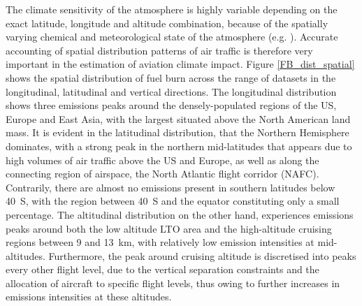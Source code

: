 The climate sensitivity of the atmosphere is highly variable depending on the exact latitude, longitude and altitude combination, because of the spatially varying chemical and meteorological state of the atmosphere (e.g. \cite{Houghton2001, Inness2013, Emmons2000}). Accurate accounting of spatial distribution patterns of air traffic is therefore very important in the estimation of aviation climate impact. Figure \ref{FB_dist_spatial} shows the spatial distribution of fuel burn across the range of datasets in the longitudinal, latitudinal and vertical directions. The longitudinal distribution shows three emissions peaks around the densely-populated regions of the US, Europe and East Asia, with the largest situated above the North American land mass. It is evident in the latitudinal distribution, that the Northern Hemisphere dominates, with a strong peak in the northern mid-latitudes that appears due to high volumes of air traffic above the US and Europe, as well as along the connecting region of airspace, the North Atlantic flight corridor (NAFC). Contrarily, there are almost no emissions present in southern latitudes below 40\textdegree~S, with the region between 40\textdegree~S and the equator constituting only a small percentage. The altitudinal distribution on the other hand, experiences emissions peaks around both the low altitude LTO area and the high-altitude cruising regions between 9 and 13~km, with relatively low emission intensities at mid-altitudes. Furthermore, the peak around cruising altitude is discretised into peaks every other flight level, due to the vertical separation constraints and the allocation of aircraft to specific flight levels, thus owing to further increases in emissions intensities at these altitudes.

